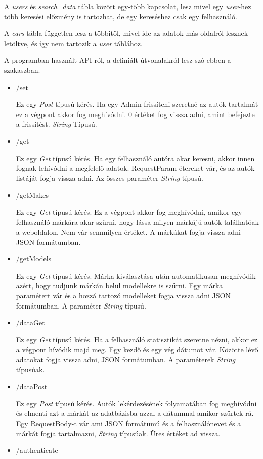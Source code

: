 A \textit{users} és \textit{search\_data} tábla között egy-több kapcsolat, lesz mivel egy \textit{user}-hez több keresési előzmény is tartozhat, de egy kereséshez csak egy felhasználó.

A \textit{cars} tábla független lesz a többitől, mivel ide az adatok más oldalról lesznek letöltve, és így nem tartozik a \textit{user} táblához.

 
A programban használt API-ról, a definiált útvonalakról lesz szó ebben a szakaszban.
\begin{itemize}
\item /set

Ez egy \textit{Post} típusú kérés. Ha egy Admin frissíteni szeretné az autók tartalmát ez a végpont akkor fog meghívódni.
0 értéket fog vissza adni, amint befejezte a frissítést. \textit{String} Típusú.
\item /get

Ez egy \textit{Get} típusú kérés. Ha egy felhasználó autóra akar keresni, akkor innen fognak lehívódni a megfelelő adatok.
RequestParam-étereket vár, és az autók listáját fogja vissza adni. Az összes paraméter \textit{String} típusú.
\item /getMakes

Ez egy \textit{Get} típusú kérés. Ez a végpont akkor fog meghívódni, amikor egy felhasználó márkára akar szűrni, hogy lássa milyen márkájú autók találhatóak a weboldalon.
Nem vár semmilyen értéket. A márkákat fogja vissza adni JSON formátumban.
\item /getModels

Ez egy \textit{Get} típusú kérés. Márka kiválasztása után automatikusan meghívódik azért, hogy tudjunk márkán belül modellekre is szűrni.
Egy márka paramétert vár és a hozzá tartozó modelleket fogja vissza adni JSON  formátumban. A paraméter \textit{String} típusú.
\item /dataGet

Ez egy \textit{Get} típusú kérés. Ha a felhasználó statisztikát szeretne nézni, akkor ez a végpont hívódik majd meg.
Egy kezdő és egy vég dátumot vár. Közötte lévő adatokat fogja vissza adni, JSON formátumban. A paraméterek \textit{String} típusúak.
\item /dataPost

Ez egy \textit{Post} típusú kérés. Autók lekérdezésének folyamatában fog meghívódni és elmenti azt a márkát az adatbázisba azzal a dátummal amikor szűrtek rá.
Egy RequestBody-t vár ami JSON formátumú és a felhasználónevet és a márkát fogja tartalmazni, \textit{String} típusúak. Üres értéket ad vissza.
\item /authenticate


\end{itemize}
